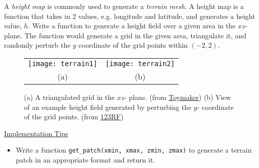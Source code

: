 \documentclass[addpoints]{exam}
\begin{document}
\begin{questions}


  A \textit{height map} is commonly used to generate a \textit{terrain mesh}. A height map is a function that takes in 2 values, e.g. longitude and latitude, and generates a height value, $h$. Write a function to generate a height field over a given area in the $xz$- plane. The function would generate a grid in the given area, triangulate it, and randomly perturb the $y$ coordinate of the grid points within $(-2, 2)$.
  \begin{figure}[!h]
    \centering
    \begin{tabular}{cc}
      \texttt{[image: terrain1]}
      & \texttt{[image: terrain2]}\\
      (a) & (b)
    \end{tabular}
    \caption{(a) A triangulated grid in the $xz$- plane. (from \href{http://keithditch.powweb.com/Games/XNA/html/xna\_terrain.html}{Toymaker}) (b) View of an example height field generated by perturbing the $y$- coordinate of the grid points. (from \href{https://www.123rf.com/photo_54102307_stock-vector-3d-wireframe-terrain-contour-vector.html}{123RF})}
  \end{figure}
  
  \noindent\underline{Implementation Tips}
  \begin{itemize}
  \item Write a function \texttt{get\_patch(xmin, xmax, zmin, zmax)} to generate a terrain patch in an appropriate format and return it.
  \end{itemize}



\end{questions}
\end{document}

